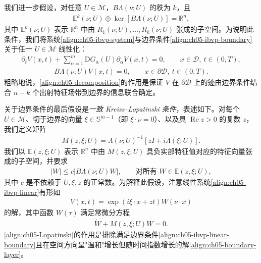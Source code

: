 \documentclass[../../main.tex]{subfiles}
\begin{document}
我们进一步假设，对任意 $U\in\mathscr{M}$，$B\Lambda(\nu;U)$ 的秩为 $k$，且
\begin{align}
\mathbb{E}^{k}(\nu;U)\oplus\ker[B\Lambda(\nu;U)]=\mathbb{R}^{n},\label{align:ch05-decomposition}
\end{align}
其中 $\mathbb{E}^{k}(\nu;U)$ 表示 $\mathbb{R}^{n}$ 中由 $R_{1}(\nu;U),\ldots,R_{k}(\nu;U)$ 张成的子空间。为说明此条件，我们将系统\eqref{align:ch05-ibvp-system}与边界条件\eqref{align:ch05-ibvp-boundary}关于任一 $U\in\mathscr{M}$ 线性化：
\begin{align}
\partial_{t}V(x,t)+\sum_{\alpha=1}^{m}\mathrm{D}G_{\alpha}(U)\partial_{\alpha}V(x,t)=0,\qquad x\in\mathscr{D},\ t\in(0,T),\label{align:ch05-ibvp-linear}
\end{align}
\begin{align}
B\Lambda(\nu;U)V(x,t)=0,\qquad x\in\partial\mathscr{D},\ t\in(0,T).\label{align:ch05-ibvp-linear-boundary}
\end{align}
粗略地说，\eqref{align:ch05-decomposition}的作用是保证 $V$ 在 $\partial\mathscr{D}$ 上的迹由边界条件结合 $n-k$ 个出射特征场带到边界的信息联合确定。

关于边界条件的最后假设是\emph{一致 Kreiss--Lopatinski 条件}，表述如下。对每个 $U\in\mathscr{M}$、切于边界的向量 $\xi\in\mathbb{S}^{m-1}$（即 $\xi\cdot\nu=0$）、以及具 $\operatorname{Re}z>0$ 的复数 $z$，我们定义矩阵
\begin{align}
M(z,\xi;U)=\Lambda(\nu;U)^{-1}[zI+i\Lambda(\xi;U)].\label{align:ch05-M-def}
\end{align}
我们以 $\mathbb{E}(z,\xi;U)$ 表示 $\mathbb{R}^{n}$ 中由 $M(z,\xi;U)$ 具负实部特征值对应的特征向量张成的子空间，并要求
\begin{align}
|W|\leqslant c|B\Lambda(\nu;U)W|,\qquad\text{对所有 }W\in\mathbb{E}(z,\xi;U),\label{align:ch05-Lopatinski}
\end{align}
其中 $c$ 是不依赖于 $U,\xi,z$ 的正常数。为解释此假设，注意线性系统\eqref{align:ch05-ibvp-linear}有形如
\begin{align}
V(x,t)=\exp(i\xi\cdot x+zt)W(\nu\cdot x)\label{align:ch05-boundary-layer}
\end{align}
的解，其中函数 $W(\tau)$ 满足常微分方程
\begin{align}
\dot{W}+M(z,\xi;U)W=0.\label{align:ch05-W-ode}
\end{align}
\eqref{align:ch05-Lopatinski}的作用是排除满足边界条件\eqref{align:ch05-ibvp-linear-boundary}且在空间方向呈"温和"增长但随时间指数增长的解\eqref{align:ch05-boundary-layer}。
\end{document}
